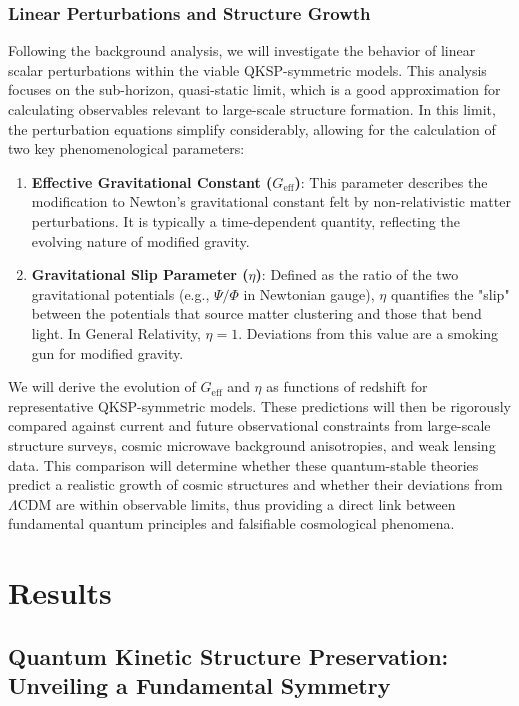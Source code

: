 \documentclass[twocolumn]{aastex631}
\begin{document}
\subsubsection{Linear Perturbations and Structure Growth}
Following the background analysis, we will investigate the behavior of linear scalar perturbations within the viable QKSP-symmetric models. This analysis focuses on the sub-horizon, quasi-static limit, which is a good approximation for calculating observables relevant to large-scale structure formation. In this limit, the perturbation equations simplify considerably, allowing for the calculation of two key phenomenological parameters:
\begin{enumerate}
    \item \textbf{Effective Gravitational Constant ($G_{\text{eff}}$)}: This parameter describes the modification to Newton's gravitational constant felt by non-relativistic matter perturbations. It is typically a time-dependent quantity, reflecting the evolving nature of modified gravity.
    \item \textbf{Gravitational Slip Parameter ($\eta$)}: Defined as the ratio of the two gravitational potentials (e.g., $\Psi/\Phi$ in Newtonian gauge), $\eta$ quantifies the "slip" between the potentials that source matter clustering and those that bend light. In General Relativity, $\eta=1$. Deviations from this value are a smoking gun for modified gravity.
\end{enumerate}
We will derive the evolution of $G_{\text{eff}}$ and $\eta$ as functions of redshift for representative QKSP-symmetric models. These predictions will then be rigorously compared against current and future observational constraints from large-scale structure surveys, cosmic microwave background anisotropies, and weak lensing data. This comparison will determine whether these quantum-stable theories predict a realistic growth of cosmic structures and whether their deviations from $\Lambda$CDM are within observable limits, thus providing a direct link between fundamental quantum principles and falsifiable cosmological phenomena.

\section{Results}
\label{sec:results}
\subsection{Quantum Kinetic Structure Preservation: Unveiling a Fundamental Symmetry}
\end{document}
